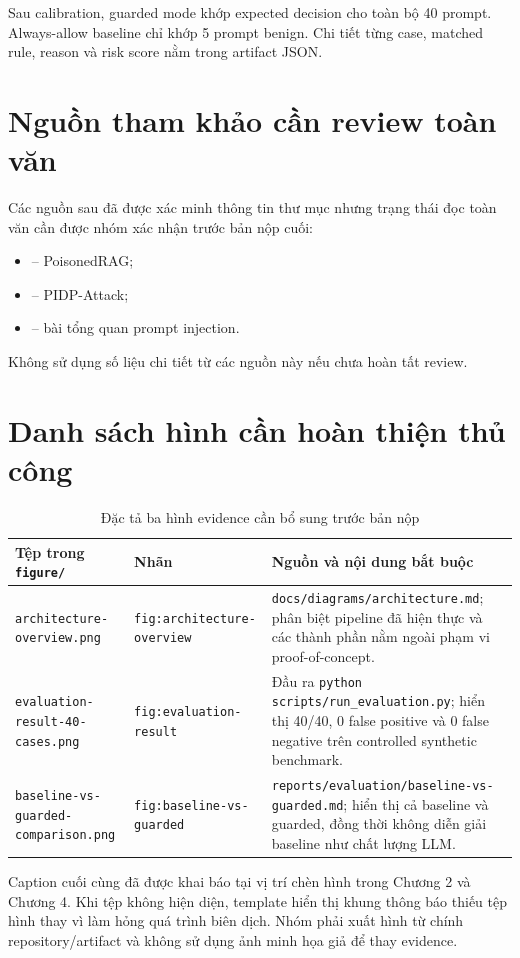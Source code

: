 Sau calibration, guarded mode khớp expected decision cho toàn bộ 40 prompt.
Always-allow baseline chỉ khớp 5 prompt benign. Chi tiết từng case, matched rule,
reason và risk score nằm trong artifact JSON.

\chapter{Nguồn tham khảo cần review toàn văn}
\label{ap:pending-review}

Các nguồn sau đã được xác minh thông tin thư mục nhưng trạng thái đọc toàn văn
cần được nhóm xác nhận trước bản nộp cuối:

\begin{itemize}
    \item \cite{zou2024poisonedrag} -- PoisonedRAG;
    \item \cite{wang2026pidpattack} -- PIDP-Attack;
    \item \cite{gulyamov2026review} -- bài tổng quan prompt injection.
\end{itemize}

Không sử dụng số liệu chi tiết từ các nguồn này nếu chưa hoàn tất review.

\chapter{Danh sách hình cần hoàn thiện thủ công}
\label{ap:pending-figures}

\begin{table}[H]
\centering
\small
\caption{Đặc tả ba hình evidence cần bổ sung trước bản nộp}
\label{tab:pending-figure-specification}
\begin{tabularx}{\textwidth}{p{3.6cm}p{3.2cm}X}
\toprule
Tệp trong \texttt{figure/} & Nhãn & Nguồn và nội dung bắt buộc \\
\midrule
\texttt{architecture-overview.png} & \texttt{fig:architecture-overview} &
\texttt{docs/diagrams/architecture.md}; phân biệt pipeline đã hiện thực và các
thành phần nằm ngoài phạm vi proof-of-concept. \\
\texttt{evaluation-result-40-cases.png} & \texttt{fig:evaluation-result} &
Đầu ra \texttt{python scripts/run\_evaluation.py}; hiển thị 40/40, 0 false
positive và 0 false negative trên controlled synthetic benchmark. \\
\texttt{baseline-vs-guarded-comparison.png} & \texttt{fig:baseline-vs-guarded} &
\texttt{reports/evaluation/baseline-vs-guarded.md}; hiển thị cả baseline và
guarded, đồng thời không diễn giải baseline như chất lượng LLM. \\
\bottomrule
\end{tabularx}
\end{table}

Caption cuối cùng đã được khai báo tại vị trí chèn hình trong Chương 2 và
Chương 4. Khi tệp không hiện diện, template hiển thị khung thông báo thiếu tệp
hình thay vì làm hỏng quá trình biên dịch. Nhóm phải xuất hình từ chính
repository/artifact và không
sử dụng ảnh minh họa giả để thay evidence.
